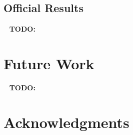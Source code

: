 \documentclass[11pt,a4paper]{article}
\begin{document}
\subsection{Official Results}

\ \newline
\textbf{TODO:}
\ \newline

\section{Future Work}\label{future}



\ \newline
\textbf{TODO:}
\ \newline




\section*{Acknowledgments}

\ \newline
\newpage


\end{document}
